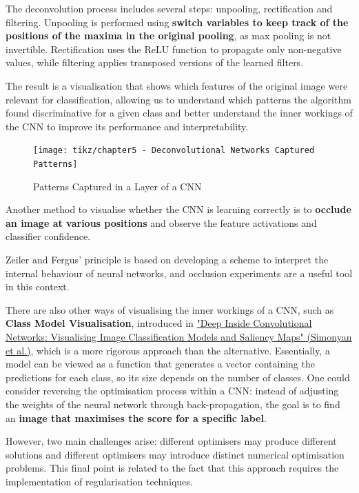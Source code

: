 The deconvolution process includes several steps: unpooling, rectification and filtering. Unpooling is performed using \textbf{switch variables to keep track of the positions of the maxima in the original pooling}, as max pooling is not invertible. Rectification uses the ReLU function to propagate only non-negative values, while filtering applies transposed versions of the learned filters.

The result is a visualisation that shows which features of the original image were relevant for classification, allowing us to understand which patterns the algorithm found discriminative for a given class and better understand the inner workings of the CNN to improve its performance and interpretability.

\begin{figure}[!htbp]
    \centering
    \texttt{[image: tikz/chapter5 - Deconvolutional Networks Captured Patterns]}
    \caption{Patterns Captured in a Layer of a CNN}
\end{figure}

Another method to visualise whether the CNN is learning correctly is to \textbf{occlude an image at various positions} and observe the feature activations and classifier confidence. 

Zeiler and Fergus' principle is based on developing a scheme to interpret the internal behaviour of neural networks, and occlusion experiments are a useful tool in this context.

There are also other ways of visualising the inner workings of a CNN, such as \textbf{Class Model Visualisation}, introduced in \href{https://arxiv.org/pdf/1312.6034}{"Deep Inside Convolutional Networks: Visualising
Image Classification Models and Saliency Maps" (Simonyan et al.)}, which is a more rigorous approach than the alternative. Essentially, a model can be viewed as a function that generates a vector containing the predictions for each class, so its size depends on the number of classes. One could consider reversing the optimisation process within a CNN: instead of adjusting the weights of the neural network through back-propagation, the goal is to find an \textbf{image that maximises the score for a specific label}. 

However, two main challenges arise: different optimisers may produce different solutions and different optimisers may introduce distinct numerical optimisation problems. This final point is related to the fact that this approach requires the implementation of regularisation techniques.

